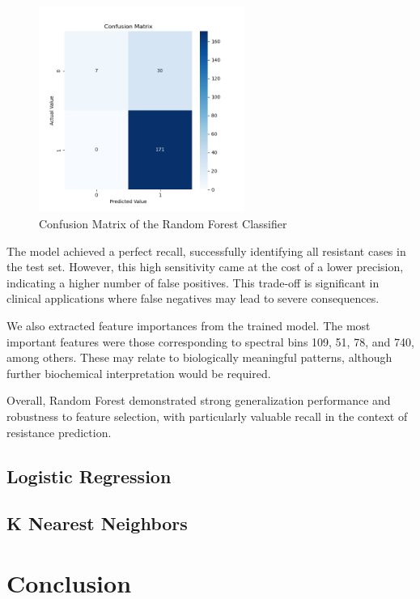 \documentclass{article}
\begin{document}
\begin{figure}[h]
  \centering
  \includegraphics[width=0.6\textwidth]{confusion_matrix_Random_Forest.png}
  \vspace{-1em}
  \caption{Confusion Matrix of the Random Forest Classifier}
\end{figure}

The model achieved a perfect recall, successfully identifying all resistant cases in the test set. However, this high sensitivity came at the cost of a lower precision, indicating a higher number of false positives. This trade-off is significant in clinical applications where false negatives may lead to severe consequences. 

We also extracted feature importances from the trained model. The most important features were those corresponding to spectral bins 109, 51, 78, and 740, among others. These may relate to biologically meaningful patterns, although further biochemical interpretation would be required.

Overall, Random Forest demonstrated strong generalization performance and robustness to feature selection, with particularly valuable recall in the context of resistance prediction.

\subsection{Logistic Regression}

\subsection{K Nearest Neighbors}

\section{Conclusion}
\end{document}
